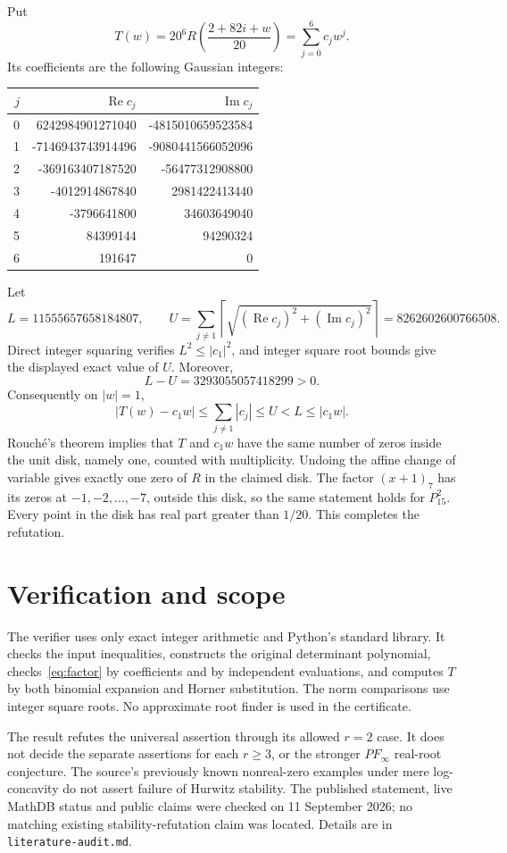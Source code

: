 \documentclass[10pt]{article}
\begin{document}
Put
\[
 T(w)=20^6 R\left(\frac{2+82i+w}{20}\right)
      =\sum_{j=0}^6 c_jw^j.
\]
Its coefficients are the following Gaussian integers:
\begin{center}
\small
\begin{tabular}{r rr}
\toprule
$j$&$\operatorname{Re}c_j$&$\operatorname{Im}c_j$\\
\midrule
0&6242984901271040&-4815010659523584\\
1&-7146943743914496&-9080441566052096\\
2&-369163407187520&-56477312908800\\
3&-4012914867840&2981422413440\\
4&-3796641800&34603649040\\
5&84399144&94290324\\
6&191647&0\\
\bottomrule
\end{tabular}
\end{center}
Let
\[
 L=11555657658184807,\qquad
 U=\sum_{j\ne1}\left\lceil
       \sqrt{(\operatorname{Re}c_j)^2+(\operatorname{Im}c_j)^2}
       \right\rceil
   =8262602600766508 .
\]
Direct integer squaring verifies $L^2\leq |c_1|^2$, and integer square
root bounds give the displayed exact value of $U$.
Moreover,
\[
 L-U=3293055057418299>0.
\]
Consequently on $|w|=1$,
\[
 |T(w)-c_1w|
 \leq\sum_{j\ne1}|c_j|
 \leq U<L\leq|c_1w|.
\]
Rouch\'e's theorem implies that $T$ and $c_1w$ have the same number
of zeros inside the unit disk, namely one, counted with multiplicity.
Undoing the affine change of variable gives exactly one zero of $R$
in the claimed disk. The factor $(x+1)_7$ has its zeros at
$-1,-2,\ldots,-7$, outside this disk, so the same statement holds for
$P_{15}^2$. Every point in the disk has real part greater than $1/20$.
This completes the refutation.

\section*{Verification and scope}

The verifier uses only exact integer arithmetic and Python's standard
library. It checks the input inequalities, constructs the original
determinant polynomial, checks~\eqref{eq:factor} by coefficients and by
independent evaluations, and computes $T$ by both binomial expansion
and Horner substitution. The norm comparisons use integer square roots.
No approximate root finder is used in the certificate.

The result refutes the universal assertion through its allowed $r=2$
case. It does not decide the separate assertions for each $r\geq3$,
or the stronger $PF_\infty$ real-root conjecture.
The source's previously known nonreal-zero examples under mere
log-concavity do not assert failure of Hurwitz stability.
The published statement, live MathDB status and public claims were checked
on 11 September 2026; no matching existing stability-refutation claim
was located. Details are in \texttt{literature-audit.md}.
\end{document}

